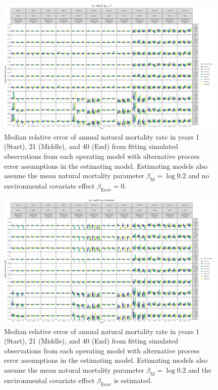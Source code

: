 \documentclass[
  12pt,
]{article}
\begin{document}
\begin{landscape}
\begin{figure}
\caption{Median relative error of annual natural mortality rate in years 1 (Start), 21 (Middle), and 40 (End) from fitting simulated observations from each operating model with alternative process error assumptions in the estimating model. Estimating models also assume the mean natural mortality parameter $\beta_\text{M} = \log 0.2$ and no environmental covariate effect $\beta_\text{Ecov} = 0$.}\label{annual_M_bias_M_fixed_beta_fixed}
\begin{center}
\includegraphics[height = \textheight]{annual_M_bias_all_PE_effect_M_fixed_beta_fixed.png}
\end{center}
\end{figure}
\end{landscape}

\begin{landscape}
\begin{figure}
\caption{Median relative error of annual natural mortality rate in years 1 (Start), 21 (Middle), and 40 (End) from fitting simulated observations from each operating model with alternative process error assumptions in the estimating model. Estimating models also assume the mean natural mortality parameter $\beta_\text{M} = \log 0.2$ and the environmental covariate effect $\beta_\text{Ecov}$ is estimated.}\label{annual_M_bias_M_fixed_beta_estimated}
\begin{center}
\includegraphics[height = \textheight]{annual_M_bias_all_PE_effect_M_fixed_beta_estimated.png}
\end{center}
\end{figure}
\end{landscape}
\end{document}
